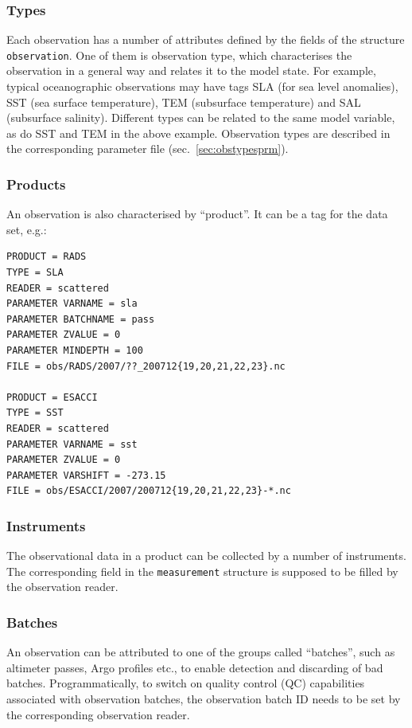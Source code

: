 \documentclass[11pt]{report}
\begin{document}
\subsubsection{Types}
\label{sec:types}

Each observation has a number of attributes defined by the fields of the structure \verb|observation|.
One of them is observation type, which characterises the observation in a general way and relates it to the model state.
For example, typical oceanographic observations may have tags SLA (for sea level anomalies), SST (sea surface temperature), TEM (subsurface temperature) and SAL (subsurface salinity).
Different types can be related to the same model variable, as do SST and TEM in the above example.
Observation types are described in the corresponding parameter file (sec.~\ref{sec:obstypesprm}).

\subsubsection{Products}

An observation is also characterised by ``product''.
It can be a tag for the data set, e.g.:
\begin{Verbatim}[frame=single,fontsize=\footnotesize]
PRODUCT = RADS
TYPE = SLA
READER = scattered
PARAMETER VARNAME = sla
PARAMETER BATCHNAME = pass
PARAMETER ZVALUE = 0
PARAMETER MINDEPTH = 100
FILE = obs/RADS/2007/??_200712{19,20,21,22,23}.nc

PRODUCT = ESACCI
TYPE = SST
READER = scattered
PARAMETER VARNAME = sst
PARAMETER ZVALUE = 0
PARAMETER VARSHIFT = -273.15
FILE = obs/ESACCI/2007/200712{19,20,21,22,23}-*.nc
\end{Verbatim}

\subsubsection{Instruments}

The observational data in a product can be collected by a number of instruments.
The corresponding field in the \verb|measurement| structure is supposed to be filled by the observation reader.

\subsubsection{Batches}

An observation can be attributed to one of the groups called ``batches'', such as altimeter passes, Argo profiles etc., to enable detection and discarding of bad batches.
Programmatically, to switch on quality control (QC) capabilities associated with observation batches, the observation batch ID needs to be set by the corresponding observation reader.
\end{document}

